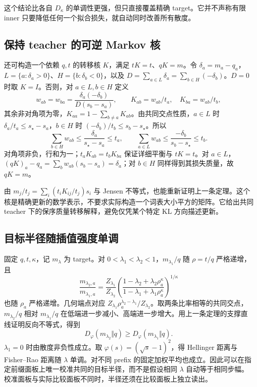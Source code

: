 这个结论比各自 $D_\kappa$ 的单调性更强，但只直接覆盖精确 target。它并不声称有限 inner 只要降低任何一个拟合损失，就自动同时改善所有散度。

\subsection{保持 teacher 的可逆 Markov 核}

还可构造一个依赖 $q,t$ 的转移核 $K$，满足 $tK=t$、$qK=m$。令 $\delta_a=m_a-q_a$，$L=\{a:\delta_a>0\}$、$H=\{b:\delta_b<0\}$，以及 $D=\sum_{a\in L}\delta_a=\sum_{b\in H}(-\delta_b)$。$D=0$ 时取 $K=I$。否则，对 $a\in L,b\in H$ 定义
\begin{equation}
 w_{ab}=w_{ba}=\frac{\delta_a(-\delta_b)}{D(s_b-s_a)},\qquad
 K_{ab}=w_{ab}/t_a,\quad K_{ba}=w_{ab}/t_b,
\end{equation}
其余非对角项为零，$K_{aa}=1-\sum_{b\ne a}K_{ab}$。由共同交点性质，$a\in L$ 时 $\delta_a/t_a\le s_\star-s_a$，$b\in H$ 时 $(-\delta_b)/t_b\le s_b-s_\star$。所以
\begin{equation}
 \sum_{b\in H}w_{ab}\le\frac{\delta_a}{s_\star-s_a}\le t_a,\qquad
 \sum_{a\in L}w_{ab}\le\frac{-\delta_b}{s_b-s_\star}\le t_b.
\end{equation}
对角项非负，行和为一；$t_aK_{ab}=t_bK_{ba}$ 保证详细平衡与 $tK=t$。对 $a\in L$，$(qK)_a-q_a=\sum_b w_{ab}(s_b-s_a)=\delta_a$；对 $b\in H$ 同样得到其损失质量，故 $qK=m$。

由 $m_j/t_j=\sum_i(t_iK_{ij}/t_j)s_i$ 与 Jensen 不等式，也能重新证明上一条定理。这个核是精确更新的数学表示，不要求实际构造一个词表大小平方的矩阵。它给出共同 teacher 下的保序质量转移解释，避免仅凭某个特定 KL 方向描述更新。

\subsection{目标半径随插值强度单调}

固定 $q,t,\kappa$，记 $m_\lambda$ 为 target。对 $0<\lambda_1<\lambda_2<1$，$m_{\lambda_1}/q$ 随 $\rho=t/q$ 严格递增，且
\begin{equation}
 \frac{m_{\lambda_2,a}}{m_{\lambda_1,a}}
 =\frac{Z_{\lambda_1}}{Z_{\lambda_2}}
 \left(\frac{1-\lambda_2+\lambda_2\rho_a^\kappa}
 {1-\lambda_1+\lambda_1\rho_a^\kappa}\right)^{1/\kappa}
\end{equation}
也随 $\rho_a$ 严格递增。几何端点对应 $Z_{\lambda_1}\rho_a^{\lambda_2-\lambda_1}/Z_{\lambda_2}$。取两条比率相等的共同交点，$m_{\lambda_2}/q$ 相对 $m_{\lambda_1}/q$ 在低端进一步减小、高端进一步增大。用上一条定理的支撑直线证明反向不等式，得到
\begin{equation}
 D_\varphi(m_{\lambda_2}\Vert q)\ge D_\varphi(m_{\lambda_1}\Vert q).
\end{equation}
$\lambda_1=0$ 时由散度非负性成立。取 $\varphi(s)=(\sqrt s-1)^2$，得 Hellinger 距离与 Fisher--Rao 距离随 $\lambda$ 单调。对不同 prefix 的固定加权平均也成立。因此可以在指定前缀面板上唯一校准共同的目标半径，而不是假设相同 $\lambda$ 自动等于相同步幅。校准面板与实际比较面板不同时，半径还须在比较面板上独立读出。

